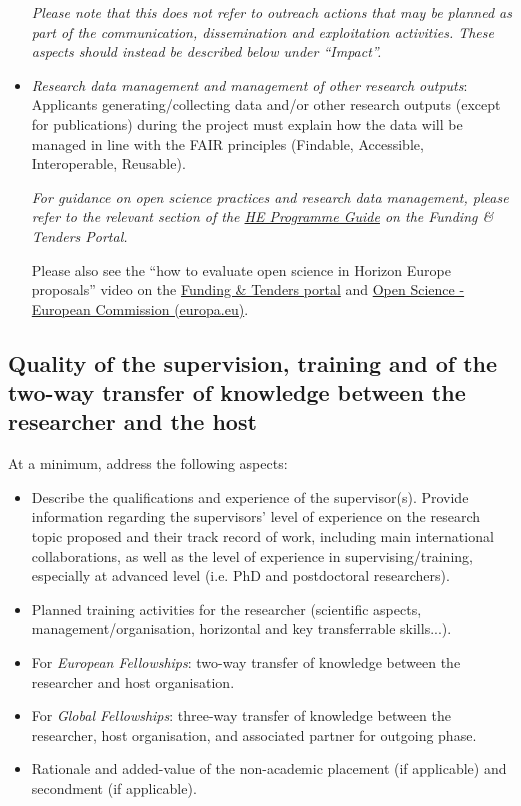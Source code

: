 \documentclass[11pt,draftproposal]{msca-pf}
\begin{document}
\begin{itemize}
    \emph{Please note that this does not refer to outreach actions that may be
    planned as part of the communication, dissemination and exploitation activities.
    These aspects should instead be described below under ``Impact''.}

    \item \emph{Research data management and management of other research outputs}:
    Applicants generating/collecting data and/or other research outputs (except for
    publications) during the project must explain how the data will be managed
    in line with the FAIR principles (Findable, Accessible, Interoperable,
    Reusable).

    \emph{For guidance on open science practices and research data management,
    please refer to the relevant section of the \href{https://ec.europa.eu/info/funding-tenders/opportunities/docs/2021-2027/horizon/guidance/programme-guide_horizon_en.pdf}{HE Programme Guide}
    on the Funding \& Tenders Portal.}

    Please also see the “how to evaluate open science in Horizon Europe proposals”
    video on the \href{https://ec.europa.eu/info/funding-tenders/opportunities/portal/screen/support/videos}{Funding \& Tenders portal} and
    \href{https://rea.ec.europa.eu/open-science_en}{Open Science - European Commission (europa.eu)}.
\end{itemize}

\subsection{Quality of the supervision, training and of the two-way transfer of
    knowledge between the researcher and the host}

At a minimum, address the following aspects:

\begin{itemize}
    \item Describe the qualifications and experience of the supervisor(s).
    Provide information regarding the supervisors' level of experience on the
    research topic proposed and their track record of work, including main
    international collaborations, as well as the level of experience in
    supervising/training, especially at advanced level (i.e. PhD and postdoctoral
    researchers).

    \item Planned training activities for the researcher (scientific aspects,
    management/organisation, horizontal and key transferrable skills...).

    \item For \emph{European Fellowships}: two-way transfer of knowledge between
    the researcher and host organisation.

    \item For \emph{Global Fellowships}: three-way transfer of knowledge between
    the researcher, host organisation, and associated partner for outgoing phase.

    \item Rationale and added-value of the non-academic placement (if applicable)
    and secondment (if applicable).
\end{itemize}
\end{document}
